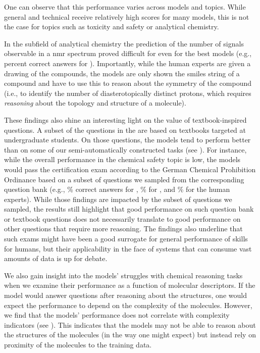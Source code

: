 \documentclass[11pt, oneside]{article}
\begin{document}
\begin{refsection}
One can observe that this performance varies across models and topics.
While general and technical receive relatively high scores for many models, this is not the case for topics such as toxicity and safety or analytical chemistry.

In the subfield of analytical chemistry the prediction of the number of signals observable in a \gls{nmr} spectrum proved difficult for even for the best models (e.g.,  percent correct answers for \oone).
Importantly, while the human experts are given a drawing of the compounds, the models are only shown the \gls{smiles} string of a compound and have to use this to reason about the symmetry of the compound (i.e., to identify the number of diasterotopically distinct protons, which requires \emph{reasoning} about the topology and structure of a molecule).

 These findings also shine an interesting light on the value of textbook-inspired questions.
 A subset of the questions in the \chembench are based on textbooks targeted at undergraduate students.
 On those questions, the models tend to perform better than on some of our semi-automatically constructed tasks (see ).
 For instance, while the overall performance in the chemical safety topic is low, the models would pass the certification exam according to the German Chemical Prohibition Ordinance based on a subset of questions we sampled from the corresponding question bank (e.g., \% correct answers for \GPTFour, \% for \ClaudeThreeFiveSonnet, and \% for the human experts).
 While those findings are impacted by the subset of questions we sampled, the results still highlight that good performance on such question bank or textbook questions does not necessarily translate to good performance on other questions that require more reasoning. The findings also underline that such exams might have been a good surrogate for general performance of skills for humans, but their applicability in the face of systems that can consume vast amounts of data is up for debate.

 We also gain insight into the models' struggles with chemical reasoning tasks when we examine their performance as a function of molecular descriptors.
 If the model would answer questions after reasoning about the structures, one would expect the performance to depend on the complexity of the molecules.
 However, we find that the models' performance does not correlate with complexity indicators (see ).
 This indicates that the models may not be able to reason about the structures of the molecules (in the way one might expect) but instead rely on proximity of the molecules to the training data.\autocite{mccoy2023embersautoregressionunderstandinglarge}


\end{refsection}
\end{document}
